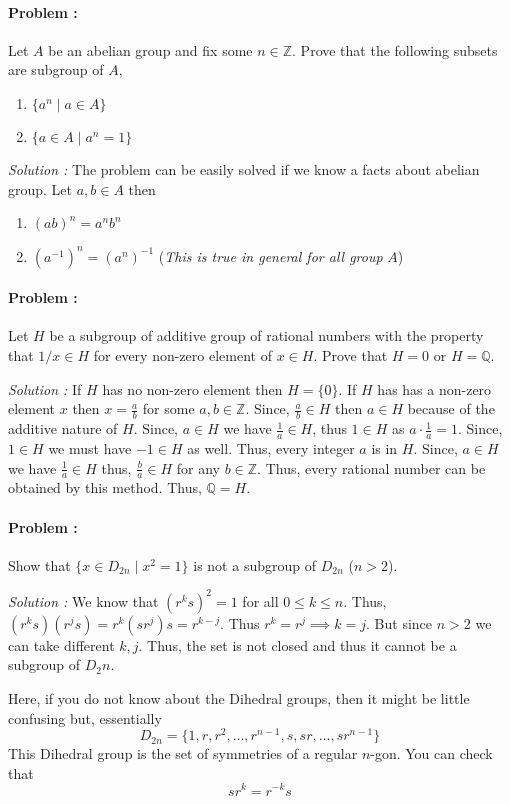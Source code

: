 \paragraph{Problem :} Let $A$ be an abelian group and fix some $n \in \mathbb{Z}$. Prove that the following subsets are subgroup of $A$,
\begin{enumerate}
    \item $\{a^n \mid a \in A\}$
    \item $\{a \in A \mid a^n =1 \}$
\end{enumerate}

\vspace{4mm}
\textit{Solution :} The problem can be easily solved if we know a facts about abelian group. Let $a,b \in A$ then
\begin{enumerate}
    \item $(ab)^n= a^n b^n$
    \item $(a^{-1})^n=(a^n)^{-1}$ \quad (\textit{This is true in general for all group }$A$)
\end{enumerate}

\paragraph{Problem :} Let $H$ be a subgroup of additive group of rational numbers with the property that $1/x \in H$ for every non-zero element of $x \in H$.
Prove that $H=0$ or $H=\mathbb{Q}$.

\vspace{4mm}
\textit{Solution :} If $H$ has no non-zero element then $H=\{0\}$. If $H$ has has a non-zero element $x$ then $x=\frac{a}{b}$ for some $a,b \in \mathbb{Z}$.
Since, $\frac{a}{b} \in H$ then $a \in H$ because of the additive nature of $H$. Since, $a \in H$ we have $\frac{1}{a} \in H$, thus $1 \in H$ as 
$a \cdot \frac{1}{a} = 1$. Since, $1 \in H$ we must have $-1 \in H$ as well. Thus, every integer $a$ is in $H$. Since, $a \in H$ we have $\frac{1}{a} \in H$
thus, $\frac{b}{a} \in H$ for any $b \in \mathbb{Z}$. Thus, every rational number can be obtained by this method. Thus, $\mathbb{Q}=H$.

\paragraph{Problem :} Show that $\{x \in D_{2n} \mid x^2 = 1\}$ is not a subgroup of $D_{2n}$ ($n>2$).


\vspace{4mm}
\textit{Solution :} We know that $(r^k s)^2=1$ for all $0 \le k \le n$. Thus, $(r^{k}s)(r^{j}s)= r^k (s r^j) s = r^{k-j}$. Thus $r^k=r^j \implies k=j$. But
since $n > 2$ we can take different $k,j$. Thus, the set is not closed and thus it cannot be a subgroup of $D_2n$.

\begin{remark}
    Here, if you do not know about the Dihedral groups, then it might be little confusing but, essentially 
    \[ D_{2n} = \{1,r,r^2,\ldots,r^{n-1},s,sr,\ldots,sr^{n-1} \} \] 
    This Dihedral group is the set of symmetries of a regular $n$-gon. You can check that
    \[ sr^k = r^{-k}s  \]
\end{remark}
